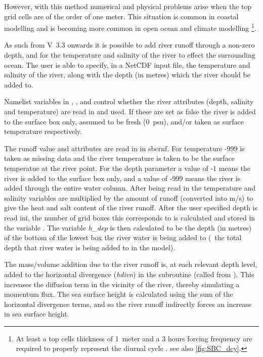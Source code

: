 \documentclass[../main/NEMO_manual]{subfiles}
\begin{document}
However, with this method numerical and physical problems arise when the top grid cells are of the order of one meter.
This situation is common in coastal modelling and is becoming more common in open ocean and climate modelling
\footnote{
  At least a top cells thickness of 1~meter and a 3 hours forcing frequency are required to
  properly represent the diurnal cycle \citep{bernie.woolnough.ea_JC05}.
  see also \autoref{fig:SBC_dcy}.}.

As such from V~3.3 onwards it is possible to add river runoff through a non-zero depth,
and for the temperature and salinity of the river to effect the surrounding ocean.
The user is able to specify, in a NetCDF input file, the temperature and salinity of the river,
along with the depth (in metres) which the river should be added to.

Namelist variables in , ,  and
 control whether the river attributes (depth, salinity and temperature) are read in and used.
If these are set as false the river is added to the surface box only, assumed to be fresh (0~psu),
and/or taken as surface temperature respectively.

The runoff value and attributes are read in in sbcrnf.
For temperature -999 is taken as missing data and the river temperature is taken to
be the surface temperatue at the river point.
For the depth parameter a value of -1 means the river is added to the surface box only,
and a value of -999 means the river is added through the entire water column.
After being read in the temperature and salinity variables are multiplied by the amount of runoff
(converted into m/s) to give the heat and salt content of the river runoff.
After the user specified depth is read ini,
the number of grid boxes this corresponds to is calculated and stored in the variable .
The variable \textit{h\_dep} is then calculated to be the depth (in metres) of
the bottom of the lowest box the river water is being added to
(\ie\ the total depth that river water is being added to in the model).

The mass/volume addition due to the river runoff is, at each relevant depth level, added to
the horizontal divergence (\textit{hdivn}) in the subroutine  (called from ).
This increases the diffusion term in the vicinity of the river, thereby simulating a momentum flux.
The sea surface height is calculated using the sum of the horizontal divergence terms,
and so the river runoff indirectly forces an increase in sea surface height.
\end{document}
